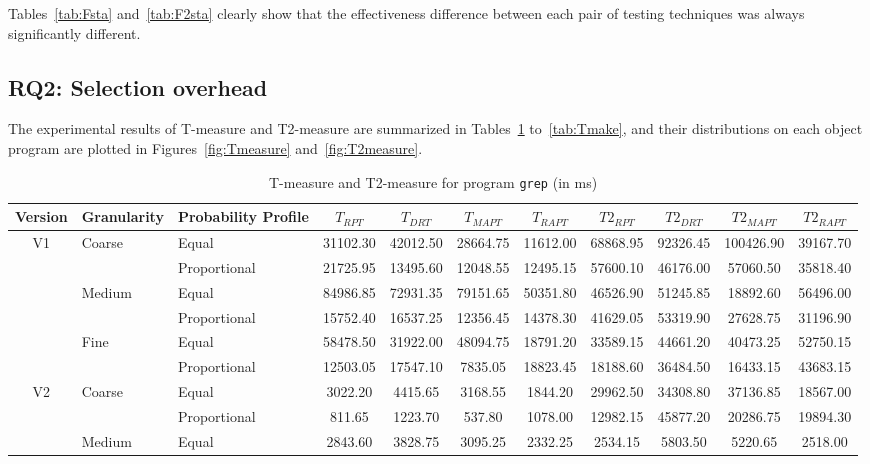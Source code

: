 \documentclass[10pt,journal,compsoc]{IEEEtran}
\begin{document}
Tables~\ref{tab:Fsta} and~\ref{tab:F2sta} clearly show that the effectiveness difference between each pair of testing techniques was always significantly different.

\subsection{RQ2: Selection overhead}

The experimental results of T-measure and T2-measure are summarized in Tables~\ref{tab:Tgrep} to~\ref{tab:Tmake}, and their distributions on each object program are plotted in Figures~\ref{fig:Tmeasure} and~\ref{fig:T2measure}.

\begin{table}
\caption{T-measure and T2-measure for program \texttt{grep} (in ms)}
\label{tab:Tgrep}
\centering
\begin{tabular}{|c|l|l|c|c|c|c|c|c|c|c|} \hline
Version	& Granularity	& Probability Profile	& $T_{RPT}$	& $T_{DRT}$	& $T_{MAPT}$	& $T_{RAPT}$	& $T2_{RPT}$	& $T2_{DRT}$	& $T2_{MAPT}$	 & $T2_{RAPT}$	\\ \hline
V1	& Coarse	& Equal	& 31102.30	& 42012.50	& 28664.75	& 11612.00	& 68868.95	& 92326.45	& 100426.90	& 39167.70	 \\ \cline{3-11}
	& 	& Proportional	& 21725.95	& 13495.60	& 12048.55	& 12495.15	& 57600.10	& 46176.00	& 57060.50	& 35818.40	 \\ \cline{2-11}
	& Medium	& Equal	& 84986.85	& 72931.35	& 79151.65	& 50351.80	& 46526.90	& 51245.85	& 18892.60	& 56496.00	 \\ \cline{3-11}
	& 	& Proportional	& 15752.40	& 16537.25	& 12356.45	& 14378.30	& 41629.05	& 53319.90	& 27628.75	& 31196.90	 \\ \cline{2-11}
	& Fine	& Equal	& 58478.50	& 31922.00	& 48094.75	& 18791.20	& 33589.15	& 44661.20	& 40473.25	& 52750.15	 \\ \cline{3-11}
	& 	& Proportional	& 12503.05	& 17547.10	& 7835.05	& 18823.45	& 18188.60	& 36484.50	& 16433.15	& 43683.15	 \\ \hline
V2	& Coarse	& Equal	& 3022.20	& 4415.65	& 3168.55	& 1844.20	& 29962.50	& 34308.80	& 37136.85	& 18567.00	 \\ \cline{3-11}
	& 	& Proportional	& 811.65	& 1223.70	& 537.80	& 1078.00	& 12982.15	& 45877.20	& 20286.75	& 19894.30	 \\ \cline{2-11}
	& Medium	& Equal	& 2843.60	& 3828.75	& 3095.25	& 2332.25	& 2534.15	& 5803.50	& 5220.65	& 2518.00	 \\ \cline{3-11}

\end{tabular}
\end{table}
\end{document}
